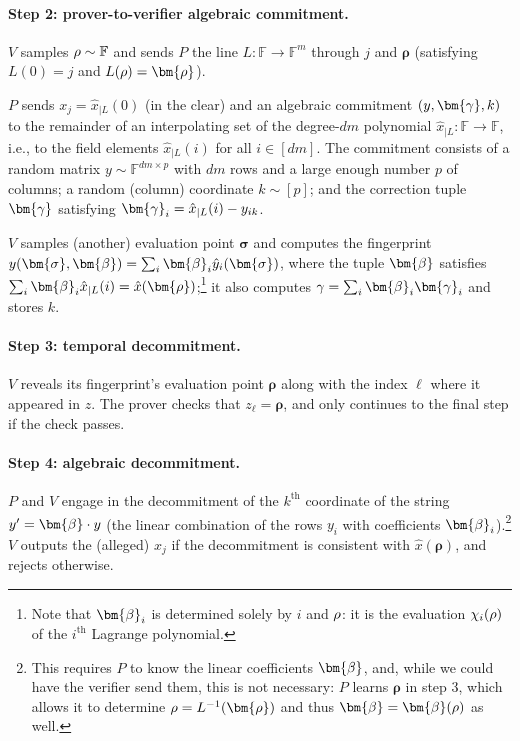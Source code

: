 \documentclass[10pt,a4paper]{article}
\newif\iflipics\lipicsfalse
\theoremstyle{definition}
\newcommand{\field}{\mathbb{F}}
\newcommand{\vcommitstring}{z}
\newcommand{\pcommitlength}{p}
\newcommand{\pcommitstring}{y}
\newcommand{\dimension}{m}
\newcommand{\degree}{d}
\newcommand{\evaluationpoint}{\bm{\fe2}}
\newcommand{\fingerprinttuple}{\bm{\rho}}
\newcommand{\Fingerprinttuple}{\bm{\sigma}}
\renewcommand{\line}{L}
\def\fe#1{
    \ifnum#1=1
        \alpha
    \else
    \ifnum#1=2
        \beta
    \else
    \ifnum#1=3
        \gamma
    \fi\fi\fi
}
\def\rfe#1{
    \ifnum#1=1
        \rho
    \else
    \ifnum#1=2
        \sigma
    \else
    \fi\fi
}
\begin{document}
    \paragraph*{Step 2: prover-to-verifier algebraic commitment\iflipics\else.\fi} $V$ samples $\rfe1 \sim \field$ and sends $P$ the line $\line: \field \to \field^\dimension$ through $j$ and $\fingerprinttuple$ (satisfying $\line(0) = j$ and $\line(\rfe1) = \fingerprinttuple$).
    
    $P$ sends $x_j = \hat x_{|\line}(0)$ (in the clear) and an algebraic commitment $(y, \bm{\fe3}, k)$ to the remainder of an interpolating set of the degree-$\degree\dimension$ polynomial $\hat x_{|\line}: \field \to \field$, i.e., to the field elements $\hat x_{|\line}(i)$ for all $i \in [\degree\dimension]$. The commitment consists of a random matrix $\pcommitstring \sim \field^{\degree\dimension \times \pcommitlength}$ with $\degree\dimension$ rows and a large enough number $\pcommitlength$ of columns; a random (column) coordinate $k \sim [\pcommitlength]$; and the correction tuple $\bm{\fe3}$ satisfying $\bm{\fe3}_i = \hat x_{|\line}(i) - \pcommitstring_{ik}$.
    
    $V$ samples (another) evaluation point $\Fingerprinttuple$ and computes the fingerprint $\pcommitstring(\Fingerprinttuple, \evaluationpoint) = \sum_i \evaluationpoint_i \hat \pcommitstring_i(\Fingerprinttuple)$, where the tuple $\evaluationpoint$ satisfies $\sum_i \evaluationpoint_i \hat x_{|\line}(i) = \hat x(\fingerprinttuple)$;\footnote{Note that $\evaluationpoint_i$ is determined solely by $i$ and $\rfe1$: it is the evaluation $\chi_i(\rfe1)$ of the $i^\text{th}$ Lagrange polynomial.} it also computes $\fe3 = \sum_i \evaluationpoint_i \bm{\fe3}_i$ and stores $k$.

    \paragraph*{Step 3: temporal decommitment\iflipics\else.\fi} $V$ reveals its fingerprint's evaluation point $\fingerprinttuple$ along with the index $\ell$ where it appeared in $\vcommitstring$. The prover checks that $\vcommitstring_\ell = \fingerprinttuple$, and only continues to the final step if the check passes.

    \paragraph*{Step 4: algebraic decommitment\iflipics\else.\fi} $P$ and $V$ engage in the decommitment of the $k^\text{th}$ coordinate of the string $\pcommitstring' = \bm{\fe2} \cdot \pcommitstring$ (the linear combination of the rows $\pcommitstring_i$ with coefficients $\evaluationpoint_i$).\footnote{This requires $P$ to know the linear coefficients $\bm{\fe2}$, and, while we could have the verifier send them, this is not necessary: $P$ learns $\fingerprinttuple$ in step 3, which allows it to determine $\rfe1 = \line^{-1}(\fingerprinttuple)$ and thus $\bm{\fe2} = \bm{\fe2}(\rfe1)$ as well.} $V$ outputs the (alleged) $x_j$ if the decommitment is consistent with $\hat x(\fingerprinttuple)$, and rejects otherwise.
\end{document}
